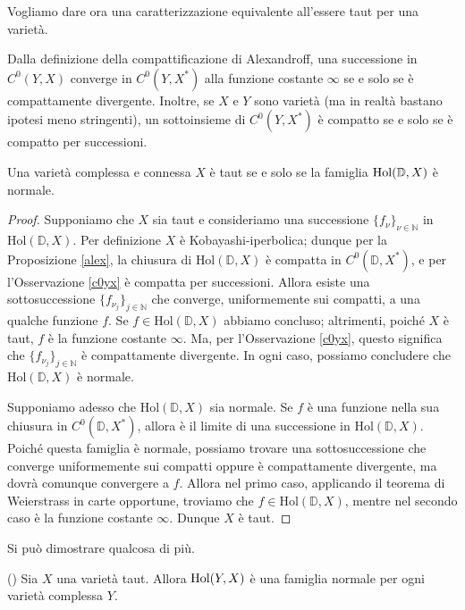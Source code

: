 Vogliamo dare ora una caratterizzazione equivalente all'essere taut per una varietà.

\begin{oss} \label{c0yx}
    Dalla definizione della compattificazione di Alexandroff, una successione in $C^0(Y,X)$ converge in $C^0(Y,X^*)$ alla funzione costante $\infty$ se e solo se è compattamente divergente. Inoltre, se $X$ e $Y$ sono varietà (ma in realtà bastano ipotesi meno stringenti), un sottoinsieme di $C^0(Y,X^*)$ è compatto se e solo se è compatto per successioni.
\end{oss}

\begin{prop}
    Una varietà complessa e connessa $X$ è taut se e solo se la famiglia $\textnormal{Hol}(\mathbb{D},X)$ è normale.
\end{prop}
\begin{proof}
    Supponiamo che $X$ sia taut e consideriamo una successione $\{f_{\nu}\}_{\nu\in\mathbb{N}}$ in $\text{Hol}(\mathbb{D},X)$. Per definizione $X$ è Kobayashi-iperbolica; dunque per la Proposizione \ref{alex}, la chiusura di $\text{Hol}(\mathbb{D},X)$ è compatta in $C^0(\mathbb{D},X^*)$, e per l'Osservazione \ref{c0yx} è compatta per successioni. Allora esiste una sottosuccessione $\{f_{\nu_j}\}_{j \in \mathbb{N}}$ che converge, uniformemente sui compatti, a una qualche funzione $f$. Se $f \in \text{Hol}(\mathbb{D},X)$ abbiamo concluso; altrimenti, poiché $X$ è taut, $f$ è la funzione costante $\infty$. Ma, per l'Osservazione \ref{c0yx}, questo significa che $\{f_{\nu_j}\}_{j \in \mathbb{N}}$ è compattamente divergente. In ogni caso, possiamo concludere che $\text{Hol}(\mathbb{D},X)$ è normale.

    Supponiamo adesso che $\text{Hol}(\mathbb{D},X)$ sia normale. Se $f$ è una funzione nella sua chiusura in $C^0(\mathbb{D},X^*)$, allora è il limite di una successione in $\text{Hol}(\mathbb{D},X)$. Poiché questa famiglia è normale, possiamo trovare una sottosuccessione che converge uniformemente sui compatti oppure è compattamente divergente, ma dovrà comunque convergere a $f$. Allora nel primo caso, applicando il teorema di Weierstrass in carte opportune, troviamo che $f \in \text{Hol}(\mathbb{D},X)$, mentre nel secondo caso è la funzione costante $\infty$. Dunque $X$ è taut.
\end{proof}

Si può dimostrare qualcosa di più.

\begin{prop}
    (\cite[Theorem 2.1.2]{A1}) Sia $X$ una varietà taut. Allora $\textnormal{Hol}(Y,X)$ è una famiglia normale per ogni varietà complessa $Y$.
\end{prop}

